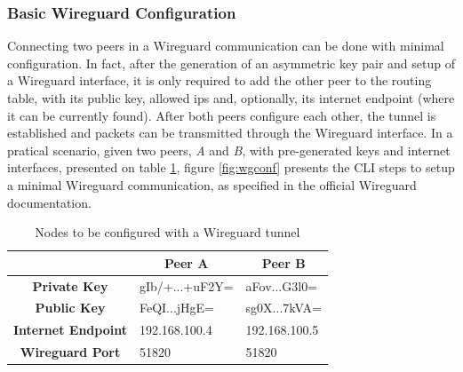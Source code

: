 \documentclass[11pt,twoside,a4paper]{report}
\begin{document}
\subsubsection{Basic Wireguard Configuration}

Connecting two peers in a Wireguard communication can be done with minimal configuration. In fact, after the generation of an asymmetric key pair and setup of a Wireguard interface, it is only required to add the other peer to the routing table, with its public key, allowed ips and, optionally, its internet endpoint (where it can be currently found). After both peers configure each other, the tunnel is established and packets can be transmitted through the Wireguard interface.
In a pratical scenario, given two peers, \emph{A} and \emph{B}, with pre-generated keys and internet interfaces, presented on table \ref{tab:wgconfpeers}, figure \ref{fig:wgconf} presents the CLI steps to setup a minimal Wireguard communication, as specified in the official Wireguard documentation.


\begin{table}[]
\centering
\begin{tabular}{c|l|l|}
\cline{2-3}
\multicolumn{1}{l|}{}                            & \multicolumn{1}{c|}{\textbf{Peer A}} & \multicolumn{1}{c|}{\textbf{Peer B}} \\ \hline
\multicolumn{1}{|c|}{\textbf{Private Key}}       & gIb/+...+uF2Y=                       & aFov...G3l0=                         \\ \hline
\multicolumn{1}{|c|}{\textbf{Public Key}}        & FeQI...jHgE=                         & sg0X...7kVA=                         \\ \hline
\multicolumn{1}{|c|}{\textbf{Internet Endpoint}} & 192.168.100.4                        & 192.168.100.5                        \\ \hline
\multicolumn{1}{|c|}{\textbf{Wireguard Port}}    & 51820                                & 51820                                \\ \hline
\end{tabular}
\label{tab:wgconfpeers}
\caption{Nodes to be configured with a Wireguard tunnel}
\end{table}
\end{document}
